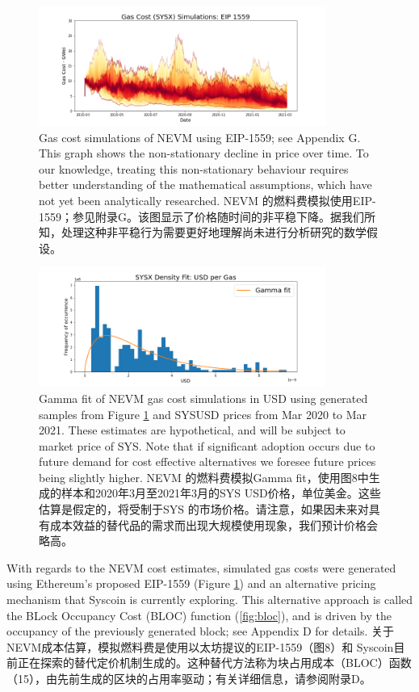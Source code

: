 \documentclass{ctexart}
\begin{document}
\begin{figure}[h!]
\centering
\includegraphics[width=3.7in]{img/sysx_gas_costs_eip_1559.png}
\caption{Gas cost simulations of NEVM using EIP-1559; see Appendix G. This graph shows the non-stationary decline in price over time. To our knowledge, treating this non-stationary behaviour requires better understanding of the mathematical assumptions, which have not yet been analytically researched. NEVM 的燃料费模拟使用EIP-1559；参见附录G。该图显示了价格随时间的非平稳下降。据我们所知，处理这种非平稳行为需要更好地理解尚未进行分析研究的数学假设。} 
\label{fig:sysx_gas_costs_eip_1559}
\end{figure} 

\begin{figure}[h!]
\centering
\includegraphics[width=3.7in]{img/sysx_usd_density.png}
\caption{Gamma fit of NEVM gas cost simulations in USD using generated samples from Figure \ref{fig:sysx_gas_costs_eip_1559} and SYSUSD prices from Mar 2020 to Mar 2021. These estimates are hypothetical, and will be subject to market price of SYS. Note that if significant adoption occurs due to future demand for cost effective alternatives we foresee future prices being slightly higher. NEVM 的燃料费模拟Gamma fit，使用图8中生成的样本和2020年3月至2021年3月的SYS USD价格，单位美金。这些估算是假定的，将受制于SYS 的市场价格。请注意，如果因未来对具有成本效益的替代品的需求而出现大规模使用现象，我们预计价格会略高。} 
\label{fig:sysx_usd_density}
\end{figure} 

With regards to the NEVM cost estimates, simulated gas costs were generated using Ethereum's proposed EIP-1559 (Figure \ref{fig:sysx_gas_costs_eip_1559}) and an alternative pricing mechanism that Syscoin is currently exploring. This alternative approach is called the BLock Occupancy Cost (BLOC) function (\ref{fig:bloc}), and is driven by the occupancy of the previously generated block; see Appendix D for details. 关于NEVM成本估算，模拟燃料费是使用以太坊提议的EIP-1559（图8）和 Syscoin目前正在探索的替代定价机制生成的。这种替代方法称为块占用成本（BLOC）函数（15），由先前生成的区块的占用率驱动；有关详细信息，请参阅附录D。
\end{document}

